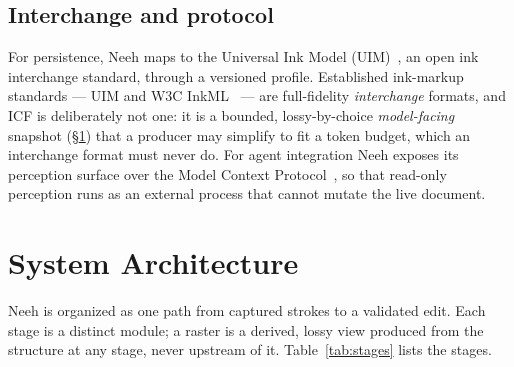 \documentclass[11pt]{article}
\begin{document}
\subsection{Interchange and protocol}
For persistence, Neeh maps to the Universal Ink Model (UIM)~\cite{uim}, an
open ink interchange standard, through a versioned profile. Established
ink-markup standards --- UIM and W3C InkML~\cite{inkml} --- are full-fidelity
\emph{interchange} formats, and ICF is deliberately not one: it is a bounded,
lossy-by-choice \emph{model-facing} snapshot (\S\ref{sec:system}) that a producer
may simplify to fit a token budget, which an interchange format must never do.
For agent integration Neeh exposes its perception surface over the Model Context
Protocol~\cite{mcp}, so that read-only perception runs as an external process
that cannot mutate the live document.

\section{System Architecture}
\label{sec:system}

Neeh is organized as one path from captured strokes to a validated edit. Each
stage is a distinct module; a raster is a derived, lossy view produced from the
structure at any stage, never upstream of it. Table~\ref{tab:stages} lists the
stages.
\end{document}

